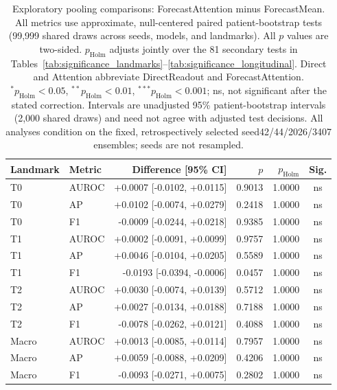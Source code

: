 \begin{table}[t]
\centering
\small
\caption{Exploratory pooling comparisons: ForecastAttention minus ForecastMean. All metrics use approximate, null-centered paired patient-bootstrap tests (99,999 shared draws across seeds, models, and landmarks). All $p$ values are two-sided. $p_{\mathrm{Holm}}$ adjusts jointly over the 81 secondary tests in Tables~\ref{tab:significance_landmarks}--\ref{tab:significance_longitudinal}. Direct and Attention abbreviate DirectReadout and ForecastAttention. $^{*}p_{\mathrm{Holm}}<0.05$, $^{**}p_{\mathrm{Holm}}<0.01$, $^{***}p_{\mathrm{Holm}}<0.001$; ns, not significant after the stated correction. Intervals are unadjusted 95\% patient-bootstrap intervals (2,000 shared draws) and need not agree with adjusted test decisions. All analyses condition on the fixed, retrospectively selected seed42/44/2026/3407 ensembles; seeds are not resampled.}
\label{tab:significance_pooling}
\begin{tabular}{llrrrc}
\toprule
Landmark & Metric & Difference [95\% CI] & $p$ & $p_{\mathrm{Holm}}$ & Sig. \\
\midrule
T0 & AUROC & +0.0007 [-0.0102, +0.0115] & 0.9013 & 1.0000 & ns \\
T0 & AP & +0.0102 [-0.0074, +0.0279] & 0.2418 & 1.0000 & ns \\
T0 & F1 & -0.0009 [-0.0244, +0.0218] & 0.9385 & 1.0000 & ns \\
T1 & AUROC & +0.0002 [-0.0091, +0.0099] & 0.9757 & 1.0000 & ns \\
T1 & AP & +0.0046 [-0.0104, +0.0205] & 0.5589 & 1.0000 & ns \\
T1 & F1 & -0.0193 [-0.0394, -0.0006] & 0.0457 & 1.0000 & ns \\
T2 & AUROC & +0.0030 [-0.0074, +0.0139] & 0.5712 & 1.0000 & ns \\
T2 & AP & +0.0027 [-0.0134, +0.0188] & 0.7188 & 1.0000 & ns \\
T2 & F1 & -0.0078 [-0.0262, +0.0121] & 0.4088 & 1.0000 & ns \\
Macro & AUROC & +0.0013 [-0.0085, +0.0114] & 0.7957 & 1.0000 & ns \\
Macro & AP & +0.0059 [-0.0088, +0.0209] & 0.4206 & 1.0000 & ns \\
Macro & F1 & -0.0093 [-0.0271, +0.0075] & 0.2802 & 1.0000 & ns \\
\bottomrule
\end{tabular}
\end{table}
